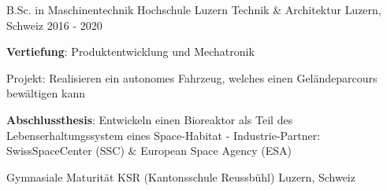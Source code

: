

\begin{cventries}

\cventry
{B.Sc. in Maschinentechnik} %
{Hochschule Luzern Technik \& Architektur} %
{Luzern, Schweiz} %
{2016 - 2020} %
{
	\begin{cvitems} %
		\item {\textbf{Vertiefung}: Produktentwicklung und Mechatronik}
		\item {Projekt: Realisieren ein autonomes Fahrzeug, welches einen Geländeparcours bewältigen kann}
		\item {\textbf{Abschlussthesis}: Entwickeln einen Bioreaktor als Teil des Lebenserhaltungssystem eines Space-Habitat - Industrie-Partner: \mbox{SwissSpaceCenter} (SSC) \& European Space Agency (ESA)}
	\end{cvitems}
}



  \cventry
    {Gymnasiale Maturität} %
    {KSR (Kantonsschule Reussbühl)} %
    {Luzern, Schweiz} %
    {} %
    {
    }

\end{cventries}
